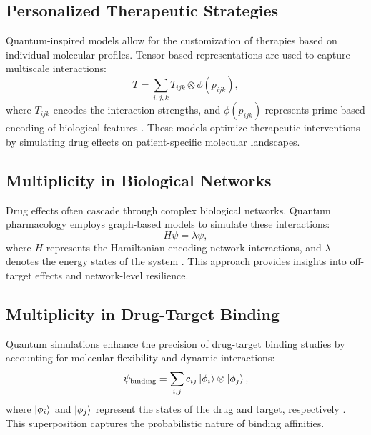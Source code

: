 \documentclass{article}
\theoremstyle{plain}
\begin{document}
\subsection{Personalized Therapeutic Strategies}
Quantum-inspired models allow for the customization of therapies based on individual molecular profiles. Tensor-based representations are used to capture multiscale interactions:
\begin{equation}
T = \sum_{i,j,k} T_{ijk} \otimes \phi(p_{ijk}),
\end{equation}
where $T_{ijk}$ encodes the interaction strengths, and $\phi(p_{ijk})$ represents prime-based encoding of biological features \cite{personalizedQuantum2023}. These models optimize therapeutic interventions by simulating drug effects on patient-specific molecular landscapes.

\subsection{Multiplicity in Biological Networks}
Drug effects often cascade through complex biological networks. Quantum pharmacology employs graph-based models to simulate these interactions:
\begin{equation}
H \psi = \lambda \psi,
\end{equation}
where $H$ represents the Hamiltonian encoding network interactions, and $\lambda$ denotes the energy states of the system \cite{bioNetworks2023}. This approach provides insights into off-target effects and network-level resilience.

\subsection{Multiplicity in Drug-Target Binding}
Quantum simulations enhance the precision of drug-target binding studies by accounting for molecular flexibility and dynamic interactions:
\begin{equation}
\psi_{\text{binding}} = \sum_{i,j} c_{ij} \ket{\phi_i} \otimes \ket{\phi_j},
\end{equation}
where $\ket{\phi_i}$ and $\ket{\phi_j}$ represent the states of the drug and target, respectively \cite{drugBinding2022}. This superposition captures the probabilistic nature of binding affinities.
\end{document}
